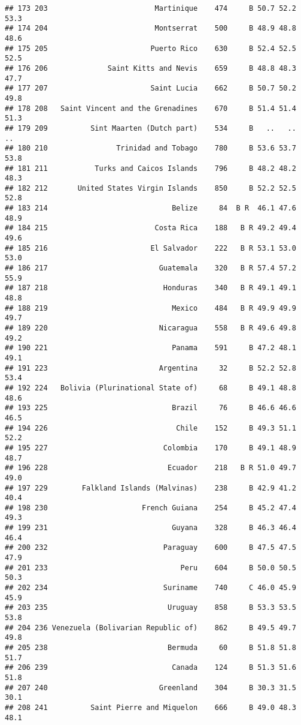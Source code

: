 \documentclass[]{article}
\begin{document}
\begin{verbatim}
## 173 203                         Martinique    474     B 50.7 52.2 53.3
## 174 204                         Montserrat    500     B 48.9 48.8 48.6
## 175 205                        Puerto Rico    630     B 52.4 52.5 52.5
## 176 206              Saint Kitts and Nevis    659     B 48.8 48.3 47.7
## 177 207                        Saint Lucia    662     B 50.7 50.2 49.8
## 178 208   Saint Vincent and the Grenadines    670     B 51.4 51.4 51.3
## 179 209          Sint Maarten (Dutch part)    534     B   ..   ..   ..
## 180 210                Trinidad and Tobago    780     B 53.6 53.7 53.8
## 181 211           Turks and Caicos Islands    796     B 48.2 48.2 48.3
## 182 212       United States Virgin Islands    850     B 52.2 52.5 52.8
## 183 214                             Belize     84  B R  46.1 47.6 48.9
## 184 215                         Costa Rica    188   B R 49.2 49.4 49.6
## 185 216                        El Salvador    222   B R 53.1 53.0 53.0
## 186 217                          Guatemala    320   B R 57.4 57.2 55.9
## 187 218                           Honduras    340   B R 49.1 49.1 48.8
## 188 219                             Mexico    484   B R 49.9 49.9 49.7
## 189 220                          Nicaragua    558   B R 49.6 49.8 49.2
## 190 221                             Panama    591     B 47.2 48.1 49.1
## 191 223                          Argentina     32     B 52.2 52.8 53.4
## 192 224   Bolivia (Plurinational State of)     68     B 49.1 48.8 48.6
## 193 225                             Brazil     76     B 46.6 46.6 46.5
## 194 226                              Chile    152     B 49.3 51.1 52.2
## 195 227                           Colombia    170     B 49.1 48.9 48.7
## 196 228                            Ecuador    218   B R 51.0 49.7 49.0
## 197 229        Falkland Islands (Malvinas)    238     B 42.9 41.2 40.4
## 198 230                      French Guiana    254     B 45.2 47.4 49.3
## 199 231                             Guyana    328     B 46.3 46.4 46.4
## 200 232                           Paraguay    600     B 47.5 47.5 47.9
## 201 233                               Peru    604     B 50.0 50.5 50.3
## 202 234                           Suriname    740     C 46.0 45.9 45.9
## 203 235                            Uruguay    858     B 53.3 53.5 53.8
## 204 236 Venezuela (Bolivarian Republic of)    862     B 49.5 49.7 49.8
## 205 238                            Bermuda     60     B 51.8 51.8 51.7
## 206 239                             Canada    124     B 51.3 51.6 51.8
## 207 240                          Greenland    304     B 30.3 31.5 30.1
## 208 241          Saint Pierre and Miquelon    666     B 49.0 48.3 48.1

\end{verbatim}
\end{document}
